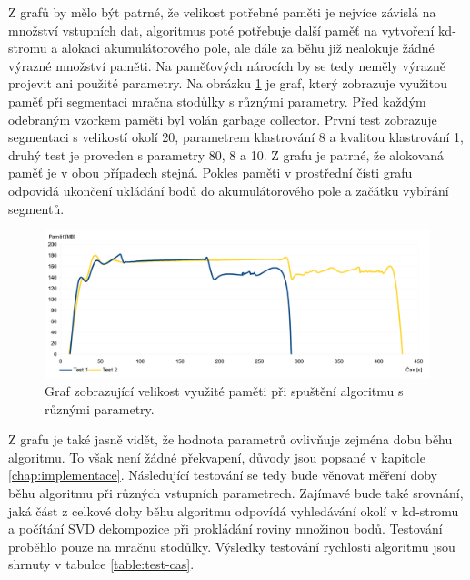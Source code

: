 \documentclass[11pt,twoside,a4paper]{book}
\begin{document}
Z grafů by mělo být patrné, že velikost potřebné paměti je nejvíce závislá na množství vstupních dat, algoritmus poté potřebuje další paměť na vytvoření kd-stromu a alokaci akumulátorového pole, ale dále za běhu již nealokuje žádné výrazné množství paměti. Na paměťových nárocích by se tedy neměly výrazně projevit ani použité parametry. Na obrázku \ref{fig:memory-graf2} je graf, který zobrazuje využitou paměť při segmentaci mračna stodůlky s různými parametry. Před každým odebraným vzorkem paměti byl volán garbage collector. První test zobrazuje segmentaci s velikostí okolí 20, parametrem klastrování 8 a kvalitou klastrování 1, druhý test je proveden s parametry 80, 8 a 10. Z grafu je patrné, že alokovaná paměť je v obou případech stejná. Pokles paměti v prostřední čísti grafu odpovídá ukončení ukládání bodů do akumulátorového pole a začátku vybírání segmentů.

\begin{figure}[ht]
\begin{center}
\includegraphics[width=\textwidth]{figures/memory-graf2}
\caption{Graf zobrazující velikost využité paměti při spuštění algoritmu s různými parametry.}
\label{fig:memory-graf2}
\end{center}
\end{figure}

Z grafu je také jasně vidět, že hodnota parametrů ovlivňuje zejména dobu běhu algoritmu. To však není žádné překvapení, důvody jsou popsané v kapitole \ref{chap:implementace}. Následující testování se tedy bude věnovat měření doby běhu algoritmu při různých vstupních parametrech. Zajímavé bude také srovnání, jaká část z celkové doby běhu algoritmu odpovídá vyhledávání okolí v kd-stromu a počítání SVD dekompozice při prokládání roviny množinou bodů. Testování proběhlo pouze na mračnu stodůlky. Výsledky testování rychlosti algoritmu jsou shrnuty v tabulce \ref{table:test-cas}.
\end{document}
